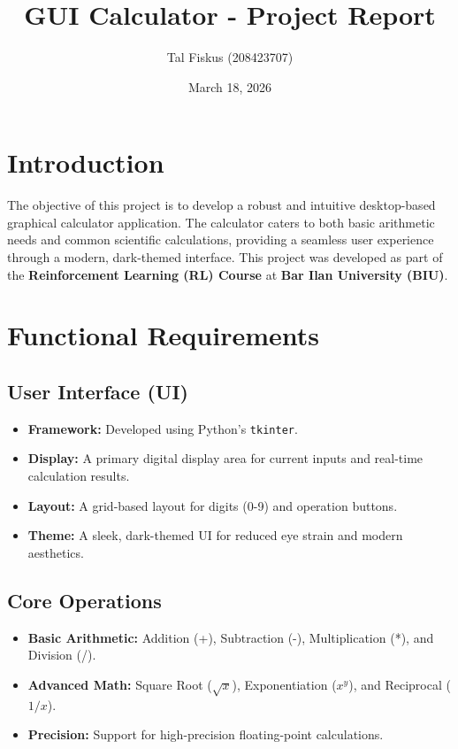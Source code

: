 \documentclass[12pt, a4paper]{article}
\title{GUI Calculator - Project Report}
\author{Tal Fiskus (208423707)}
\date{March 18, 2026}
\begin{document}
\maketitle

\section{Introduction}
The objective of this project is to develop a robust and intuitive desktop-based graphical calculator application. The calculator caters to both basic arithmetic needs and common scientific calculations, providing a seamless user experience through a modern, dark-themed interface. This project was developed as part of the \textbf{Reinforcement Learning (RL) Course} at \textbf{Bar Ilan University (BIU)}.

\section{Functional Requirements}

\subsection{User Interface (UI)}
\begin{itemize}
    \item \textbf{Framework:} Developed using Python's \texttt{tkinter}.
    \item \textbf{Display:} A primary digital display area for current inputs and real-time calculation results.
    \item \textbf{Layout:} A grid-based layout for digits (0-9) and operation buttons.
    \item \textbf{Theme:} A sleek, dark-themed UI for reduced eye strain and modern aesthetics.
\end{itemize}

\subsection{Core Operations}
\begin{itemize}
    \item \textbf{Basic Arithmetic:} Addition (+), Subtraction (-), Multiplication (*), and Division (/).
    \item \textbf{Advanced Math:} Square Root ($\sqrt{x}$), Exponentiation ($x^y$), and Reciprocal ($1/x$).
    \item \textbf{Precision:} Support for high-precision floating-point calculations.
\end{itemize}
\end{document}
